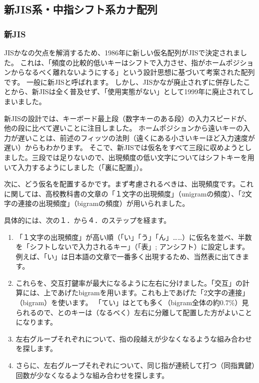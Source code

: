 \subsection{新JIS系・中指シフト系カナ配列}
\subsubsection*{新JIS}

JISかなの欠点を解消するため、1986年に新しい仮名配列がJISで決定されました。
これは、「頻度の比較的低いキーはシフトで入力させ、指がホームポジションからなるべく離れないようにする」という設計思想に基づいて考案された配列です。
一般に新JISと呼ばれます。
しかし、JISかなが廃止されずに併存したことから、新JISは全く普及せず、「使用実態がない」として1999年に廃止されてしまいました。

新JISの設計では、キーボード最上段（数字キーのある段）の入力スピードが、他の段に比べて遅いことに注目しました。
ホームポジションから遠いキーの入力が遅いことは、前述のフィッツの法則（遠くにある小さいキーほど入力速度が遅い）からもわかります。
そこで、新JISでは仮名をすべて三段に収めようとしました。三段では足りないので、出現頻度の低い文字についてはシフトキーを用いて入力するようにしました（「裏に配置」）。

次に、どう仮名を配置するかです。まず考慮されるべきは、出現頻度です。これに関しては、高校教科書の文章の「１文字の出現頻度」（unigramの頻度）、「2文字の連接の出現頻度」（bigramの頻度）が用いられました。

具体的には、次の１．から４．のステップを経ます。

\begin{enumerate}
\item 「１文字の出現頻度」が高い順（「い」「う」「ん」……）に仮名を並べ、半数を「シフトしないで入力されるキー」（「表」; アンシフト）に設定します。
例えば、「い」は日本語の文章で一番多く出現するため、当然表に出てきます。
\item これらを、交互打鍵率が最大になるように左右に分けました。「交互」の計算には、上であげたbigramを用います。これも上であげた「2文字の連接」（bigram）を使います。
    「てい」はとても多く（bigram全体の約0.7\%）見られるので、とのキーは（なるべく）左右に分離して配置した方がよいことになります。
\item 左右グループそれぞれについて、指の段越えが少なくなるような組み合わせを探します。
\item さらに、左右グループそれぞれについて、同じ指が連続して打つ（同指異鍵）回数が少なくなるような組み合わせを探します。
\end{enumerate}


